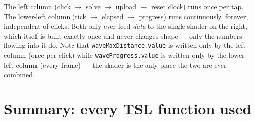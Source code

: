\documentclass[11pt]{article}
\newcommand{\code}[1]{\texttt{#1}}
\begin{document}
The left column (click $\to$ solve $\to$ upload $\to$ reset clock) runs once per tap. The
lower-left column (tick $\to$ elapsed $\to$ progress) runs continuously, forever, independent
of clicks. Both only ever feed \emph{data} to the single shader on the right, which itself
is built exactly once and never changes shape --- only the numbers flowing into it do. Note
that \code{waveMaxDistance.value} is written only by the left column (once per click) while
\code{waveProgress.value} is written only by the lower-left column (every frame) --- the
shader is the only place the two are ever combined.

\section{Summary: every TSL function used}
\label{sec:tslsummary}
\end{document}
